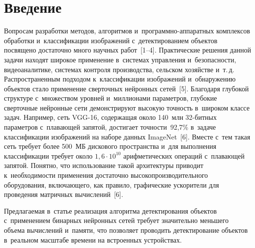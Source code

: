   
\vspace*{-4pt}



\thispagestyle{headings}

\begin{multicols}{2}

\label{st\stat}

\section{Введение}

\vspace*{-2pt}

  Вопросам разработки методов, алгоритмов и~про\-грам\-мно-ап\-па\-рат\-ных 
комплексов обработки и~классификации изображений с~детектированием 
объектов по\-свя\-ще\-но до\-ста\-точ\-но много научных работ~[1--4]. Практические 
решения данной задачи находят широкое применение в~сис\-те\-мах управ\-ле\-ния 
и~безопас\-ности, видеоаналитике, сис\-те\-мах конт\-ро\-ля производства, сельском 
хозяйстве и~т.\,д. Распространенным подходом к~классификации изображений 
и~обнаружению объектов стало применение сверточных нейронных сетей~[5]. 
Благодаря глубокой структуре с~множеством уровней и~миллионами па\-ра\-мет\-ров, 
глубокие сверточные нейронные сети демонстрируют высокую точ\-ность 
в~широком классе задач. Например, сеть VGG-16, содержащая около 
140~млн 32-бит\-ных па\-ра\-мет\-ров с~пла\-ва\-ющей запятой, достигает  
точ\-ности~92,7\% в~задаче классификации изображений на наборе данных 
ImageNet~[6]. Вмес\-те с~тем такая сеть требует более 500~МБ дискового 
пространства и~для выполнения классификации требует около $1{,}6\cdot 
10^{10}$ ариф\-ме\-ти\-че\-ских операций с~пла\-ва\-ющей запятой. Понятно, что 
использование такой архитектуры приводит к~не\-об\-хо\-ди\-мости применения 
до\-ста\-точ\-но высокопроизводительного оборудования, вклю\-ча\-юще\-го, как 
правило, графические ускорители для проведения мат\-рич\-ных вы\-чис\-ле\-ний~[6]. 
  
  Предлагаемая в~статье реализация алгоритма детектирования объектов 
с~применением бинарных нейронных сетей требует значительно меньшего 
объема вы\-чис\-ле\-ний и~памяти, что поз\-во\-ля\-ет проводить детектирование 
объектов в~реальном мас\-шта\-бе времени на встро\-ен\-ных устрой\-ст\-вах. 

  \begin{figure*} %
  \vspace*{1pt}
\begin{center}
   \mbox{%
\epsfxsize=162.253mm 
}


\end{center}
\end{figure*}
\end{multicols}
